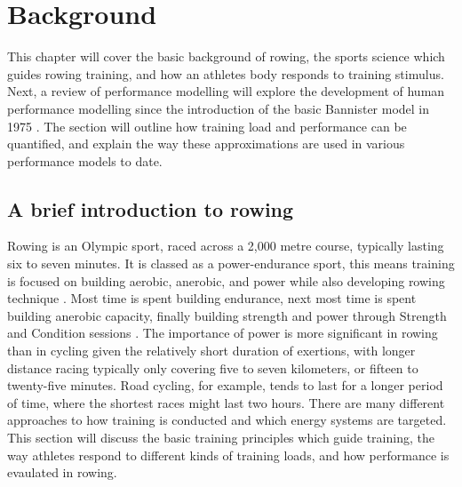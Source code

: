 \chapter{Background}
\label{chap:background}
This chapter will cover the basic background of rowing, the sports science which guides rowing training, and how an athletes body responds to training stimulus. Next, a review of performance modelling will explore the development of human performance modelling since the introduction of the basic Bannister model in 1975 \autocite{Bannister1976}. The section will outline how training load and performance can be quantified, and explain the way these approximations are used in various performance models to date.

\section{A brief introduction to rowing}
Rowing is an Olympic sport, raced across a 2,000 metre course, typically lasting six to seven minutes. It is classed as a power-endurance sport, this means training is focused on building aerobic, anerobic, and power while also developing rowing technique \autocite{Mäestu2005}. Most time is spent building endurance, next most time is spent building anerobic capacity, finally building strength and power through Strength and Condition sessions \autocite{Seiler2006}. The importance of power is more significant in rowing than in cycling given the relatively short duration of exertions, with longer distance racing typically only covering five to seven kilometers, or fifteen to twenty-five minutes. Road cycling, for example, tends to last for a longer period of time, where the shortest races might last two hours. There are many different approaches to how training is conducted and which energy systems are targeted. This section will discuss the basic training principles which guide training, the way athletes respond to different kinds of training loads, and how performance is evaulated in rowing. 


